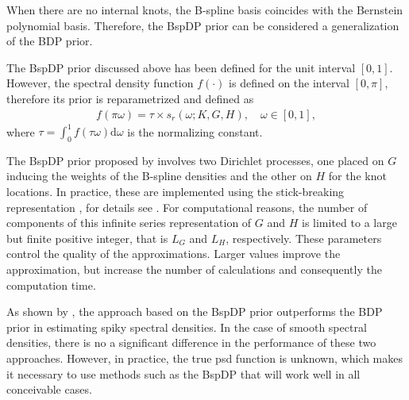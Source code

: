 \documentclass[twocolumn,final]{svjour3}
\begin{document}
When there are no internal knots, the B-spline basis coincides with the Bernstein polynomial basis.  Therefore, the BspDP  prior can be considered  a generalization of the BDP prior.  


The BspDP prior discussed above has been defined for the unit interval $[0,1]$.  However, the spectral density function $f(\cdot)$ is defined on the interval $[0,\pi]$, therefore its prior is reparametrized and defined as
\begin{align*}
f(\pi \omega) = \tau \times s_r(\omega;K,G,H), \quad \omega \in [0,1],
\end{align*}
where $\tau = \int_{0}^{1}f(\tau \omega)\text{d}\omega$ is the normalizing constant.




The BspDP prior proposed by \cite{Edwards2018} involves two  Dirichlet processes, one  placed on $G$ inducing  the weights of the B-spline densities and the other on  $H$ for the knot locations.  In practice, these are implemented using   the  stick-breaking representation \citep{Sethuraman:1994}, for details see \cite{Edwards2018}. 
For computational reasons, the number of components of this infinite series representation of $G$ and $H$ is limited to a large but finite positive integer, that is $L_G$ and $L_H$, respectively.  These parameters control the quality of the approximations.  Larger values improve the approximation, but increase the number of calculations and consequently the computation time.

As shown by \cite{Edwards2018}, the approach based on the  BspDP prior outperforms the BDP prior in estimating spiky spectral densities.  In the case of smooth
spectral densities, there is no a significant difference in the performance of these two approaches.  However, in practice, the true psd function is unknown, which makes it necessary to use   methods such as the BspDP that will work well in all conceivable cases.
\end{document}
